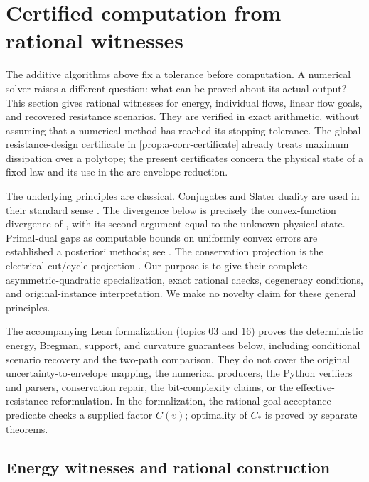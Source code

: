 \section{Certified computation from rational witnesses}
\label{sec:a-cert}

The additive algorithms above fix a tolerance before computation. A
numerical solver raises a different question: what can be proved about
its actual output? This section gives rational witnesses for energy,
individual flows, linear flow goals, and recovered resistance scenarios.
They are verified in exact arithmetic, without assuming that a numerical
method has reached its stopping tolerance.
The global resistance-design certificate in
\cref{prop:a-corr-certificate} already treats maximum dissipation over a
polytope; the present certificates concern the physical state of a fixed
law and its use in the arc-envelope reduction.

The underlying principles are classical. Conjugates and Slater duality
are used in their standard sense
\citep[Sections 3.3, 5.1.6, and 5.2.3]{boyd2004-convex}.
The divergence below is precisely the convex-function divergence of
\citet[p.~206, equation (1.4)]{bregman1967-relaxation}, with its second
argument equal to the unknown physical state. Primal-dual gaps as
computable bounds on uniformly convex errors are established a posteriori
methods; see \citet[Section 3, Proposition 3.1]{bartels2020-primal-dual}.
The conservation projection is the electrical cut/cycle projection
\citep[Chapter 2, Section 4]{lyons2016-probability}.
Our purpose is to give their complete asymmetric-quadratic specialization,
exact rational checks, degeneracy conditions, and original-instance
interpretation. We make no novelty claim for these general principles.

The accompanying Lean formalization (topics 03 and 16) proves the
deterministic energy, Bregman, support, and
curvature guarantees below, including conditional scenario recovery and
the two-path comparison. They do not cover the original
uncertainty-to-envelope mapping, the numerical producers, the Python
verifiers and parsers, conservation repair, the bit-complexity claims,
or the effective-resistance reformulation. In the formalization, the
rational goal-acceptance predicate checks a supplied factor $C(v)$;
optimality of $C_*$ is proved by separate theorems.

\subsection{Energy witnesses and rational construction}

